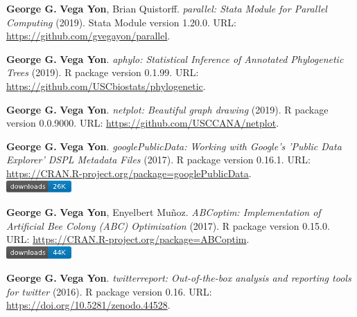 \item \textbf{George G.} \textbf{Vega Yon}, Brian Quistorff. \textit{parallel: Stata Module for Parallel Computing} (2019). Stata Module version 1.20.0. {\small URL}: \url{https://github.com/gvegayon/parallel}.  
\item \textbf{George G.} \textbf{Vega Yon}. \textit{aphylo: Statistical Inference of Annotated Phylogenetic Trees} (2019). R package version 0.1.99. {\small URL}: \url{https://github.com/USCbiostats/phylogenetic}.  
\item \textbf{George G.} \textbf{Vega Yon}. \textit{netplot: Beautiful graph drawing} (2019). R package version 0.0.9000. {\small URL}: \url{https://github.com/USCCANA/netplot}.  
\item \textbf{George G.} \textbf{Vega Yon}. \textit{googlePublicData: Working with Google's 'Public Data Explorer' DSPL Metadata Files} (2017). R package version 0.16.1. {\small URL}: \url{https://CRAN.R-project.org/package=googlePublicData}. \\\includegraphics[width=2.5cm]{fig/cran-downloads-googlepublicdata.pdf} 
\item \textbf{George G.} \textbf{Vega Yon}, Enyelbert Muñoz. \textit{ABCoptim: Implementation of Artificial Bee Colony (ABC) Optimization} (2017). R package version 0.15.0. {\small URL}: \url{https://CRAN.R-project.org/package=ABCoptim}. \\\includegraphics[width=2.5cm]{fig/cran-downloads-abcoptim.pdf} 
\item \textbf{George G.} \textbf{Vega Yon}. \textit{{twitterreport: Out-of-the-box analysis and 
	reporting tools for twitter}} (2016). R package version 0.16. {\small URL}: \url{https://doi.org/10.5281/zenodo.44528}.  
